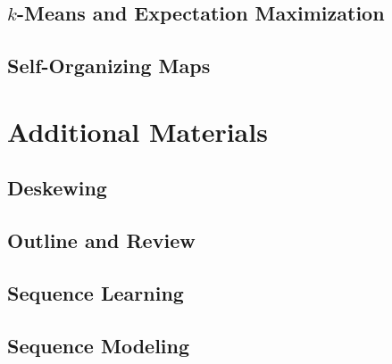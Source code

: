 \documentclass{book}
\begin{document}
\chapter{$k$-Means and Expectation Maximization}





\chapter{Self-Organizing Maps}


\part{Additional Materials}

\appendix

\chapter{Deskewing}


\chapter{Outline and Review}


%

\chapter{Sequence Learning}


\chapter{Sequence Modeling}

\end{document}
